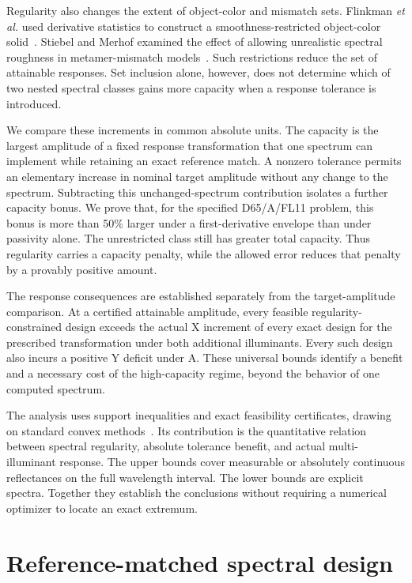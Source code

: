 \documentclass{optica-article}
\begin{document}
Regularity also changes the extent of object-color and mismatch sets. Flinkman \emph{et al.} used derivative statistics to construct a smoothness-restricted object-color solid~\cite{Flinkman2012}. Stiebel and Merhof examined the effect of allowing unrealistic spectral roughness in metamer-mismatch models~\cite{Stiebel2017}. Such restrictions reduce the set of attainable responses. Set inclusion alone, however, does not determine which of two nested spectral classes gains more capacity when a response tolerance is introduced.

We compare these increments in common absolute units. The capacity is the largest amplitude of a fixed response transformation that one spectrum can implement while retaining an exact reference match. A nonzero tolerance permits an elementary increase in nominal target amplitude without any change to the spectrum. Subtracting this unchanged-spectrum contribution isolates a further capacity bonus. We prove that, for the specified D65/A/FL11 problem, this bonus is more than 50\% larger under a first-derivative envelope than under passivity alone. The unrestricted class still has greater total capacity. Thus regularity carries a capacity penalty, while the allowed error reduces that penalty by a provably positive amount.

The response consequences are established separately from the target-amplitude comparison. At a certified attainable amplitude, every feasible regularity-constrained design exceeds the actual X increment of every exact design for the prescribed transformation under both additional illuminants. Every such design also incurs a positive Y deficit under A. These universal bounds identify a benefit and a necessary cost of the high-capacity regime, beyond the behavior of one computed spectrum.

The analysis uses support inequalities and exact feasibility certificates, drawing on standard convex methods~\cite{Boyd2004}. Its contribution is the quantitative relation between spectral regularity, absolute tolerance benefit, and actual multi-illuminant response. The upper bounds cover measurable or absolutely continuous reflectances on the full wavelength interval. The lower bounds are explicit spectra. Together they establish the conclusions without requiring a numerical optimizer to locate an exact extremum.

\section{Reference-matched spectral design}
\end{document}
